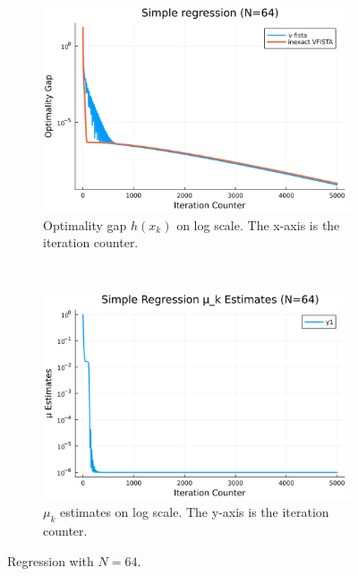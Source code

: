 \documentclass[12pt]{article}
\begin{document}
        \begin{figure}[H]
            \centering
            \begin{subfigure}[b]{0.47\textwidth}
                \centering
                \includegraphics[width=\textwidth]{assets/simple_regression_loss_64.png}
                \caption{Optimality gap $h(x_k)$ on log scale. The x-axis is the iteration counter. }
                \label{fig:simple-regression-optimality-gap-64}
            \end{subfigure}
            ~
            \begin{subfigure}[b]{0.47\textwidth}
                \centering
                \includegraphics[width=\textwidth]{assets/simple_regression_loss_sc_estimates_64.png}
                \caption{$\mu_k$ estimates on log scale. The y-axis is the iteration counter. }
                \label{fig:simple-regression-mu-estimates-64}
            \end{subfigure}
            \caption{Regression with $N=64$. }
            \label{fig:simple-regression-64}
        \end{figure}
\end{document}
